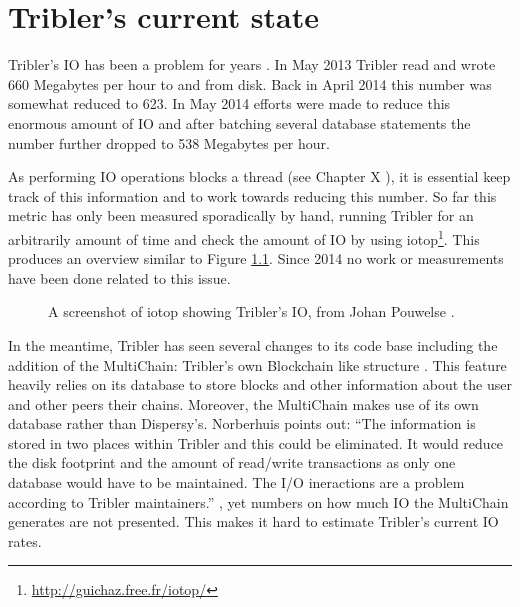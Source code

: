 \chapter{Tribler's current state}

Tribler's IO has been a problem for years \cite{pouwelse2014reduce}.
In May 2013 Tribler read and wrote 660 Megabytes per hour to and from disk.
Back in April 2014 this number was somewhat reduced to 623.
In May 2014 efforts were made to reduce this enormous amount of IO and after batching several database statements the number further dropped to 538 Megabytes per hour.

As performing IO operations blocks a thread (see Chapter X ), it is essential keep track of this information and to work towards reducing this number.
So far this metric has only been measured sporadically by hand, running Tribler for an arbitrarily amount of time and check the amount of IO by using iotop\footnote{\url{http://guichaz.free.fr/iotop/}}.
This produces an overview similar to Figure \ref{fig:iotop_tribler_april_2014}.
Since 2014 no work or measurements have been done related to this issue.

\begin{figure}[h]
	\caption{A screenshot of iotop showing Tribler's IO, from Johan Pouwelse \cite{pouwelse2014reduce}.}
	\label{fig:iotop_tribler_april_2014}
\end{figure}

In the meantime, Tribler has seen several changes to its code base including the addition of the MultiChain: Tribler's own Blockchain like structure \cite{norberhuis2015multichain}.
This feature heavily relies on its database to store blocks and other information about the user and other peers their chains.
Moreover, the MultiChain makes use of its own database rather than Dispersy's.
Norberhuis points out: ``The information is stored in two places within Tribler and this could be eliminated. It would reduce the disk footprint and the amount of read/write transactions as only one database would have to be maintained. The I/O ineractions are a problem according to Tribler maintainers.'' \cite{norberhuis2015multichain}, yet numbers on how much IO the MultiChain generates are not presented.
This makes it hard to estimate Tribler's current IO rates.
 

